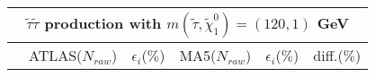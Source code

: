 \documentclass[12pt,A4paper,pdftex, ]{article}
\begin{document}
\begin{table}[h!]
\begin{center}
\begin{tabular}{|c|c|c|c|c|c|}
\hline
\multicolumn{6}{|c|}{ \textbf{$ \tilde{\tau}\tilde{\tau} $ production with $ m(\tilde{\tau},\tilde{\chi}^0_1) = (120,1) $ GeV} }\\
\hline\hline
 & ATLAS($N_{raw}$) & $\epsilon_i$($\%$) & MA5($N_{raw}$) & $\epsilon_i$($\%$) & diff.($\%$) \\
\hline\hline



\end{tabular}
\end{center}
\end{table}
\end{document}
